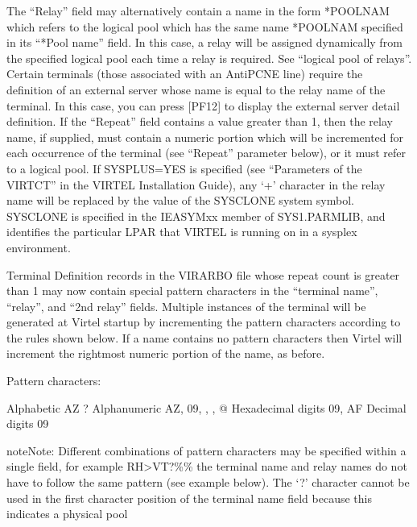 \documentclass[letterpaper,10pt,english]{sphinxmanual}
\begin{document}
\begin{description}
The “Relay” field may alternatively contain a name in the form *POOLNAM which refers to the logical pool which has the same name *POOLNAM specified in its “*Pool name” field. In this case, a relay will be assigned dynamically from the specified logical pool each time a relay is required. See “logical pool of relays”. Certain terminals (those associated with an AntiPCNE line) require the definition of an external server whose name is equal to the relay name of the terminal. In this case, you can press {[}PF12{]} to display the external server detail definition. If the “Repeat” field contains a value greater than 1, then the relay name, if supplied, must contain a numeric portion which will be incremented for each occurrence of the terminal (see “Repeat” parameter below), or it must refer to a logical pool. If SYSPLUS=YES is specified (see “Parameters of the VIRTCT” in the VIRTEL Installation Guide), any ‘+’ character in the relay name will be replaced by the value of the SYSCLONE system symbol. SYSCLONE is specified in the IEASYMxx member of SYS1.PARMLIB, and identifies the particular LPAR that VIRTEL is running on in a sysplex environment.

Terminal Definition records in the VIRARBO file whose repeat count is greater than 1 may now contain special pattern characters in the “terminal name”, “relay”, and “2nd relay” fields. Multiple instances of the terminal will be generated at Virtel startup by incrementing the pattern characters according to the rules shown below. If a name contains no pattern characters then Virtel will increment the rightmost numeric portion of the name, as before.

\end{description}

Pattern characters:

\begin{sphinxVerbatim}[commandchars=\\\{\}]
\PYGZgt{}  Alphabetic A\PYGZhy{}Z
?  Alphanumeric A\PYGZhy{}Z, 0\PYGZhy{}9, \PYGZdl{}, \PYGZsh{}, @
\PYGZpc{}  Hexadecimal digits 0\PYGZhy{}9, A\PYGZhy{}F
\PYGZlt{}  Decimal digits 0\PYGZhy{}9
\end{sphinxVerbatim}

\begin{sphinxadmonition}{note}{Note:}
Different combinations of pattern characters may be specified within a single field, for example RH\textgreater{}VT?\%\% the terminal name and relay names do not have to follow the same pattern (see example below). The ‘?’ character cannot be used in the first character position of the terminal name field because this indicates a physical pool
\end{sphinxadmonition}
\end{document}
